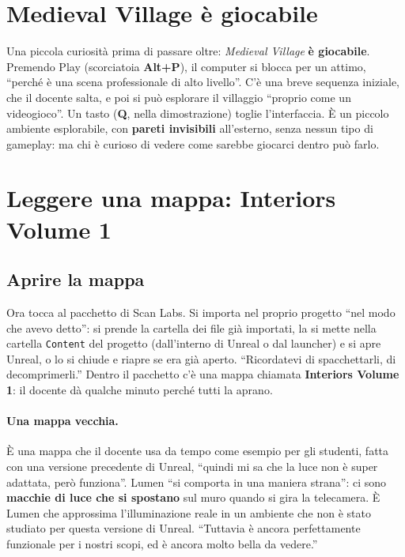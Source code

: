\section{Medieval Village è giocabile}
\label{gd14:sec:play}

Una piccola curiosità prima di passare oltre: \emph{Medieval Village} \textbf{è
giocabile}. Premendo Play (scorciatoia \textbf{Alt+P}), il computer si blocca per un
attimo, ``perché è una scena professionale di alto livello''. C'è una breve
sequenza iniziale, che il docente salta, e poi si può esplorare il villaggio
``proprio come un videogioco''. Un tasto (\textbf{Q}, nella dimostrazione) toglie
l'interfaccia. È un piccolo ambiente esplorabile, con \textbf{pareti invisibili}
all'esterno, senza nessun tipo di gameplay: ma chi è curioso di vedere come sarebbe
giocarci dentro può farlo.

\section{Leggere una mappa: Interiors Volume 1}
\label{gd14:sec:scanlabs}

\subsection{Aprire la mappa}

Ora tocca al pacchetto di Scan Labs. Si importa nel proprio progetto ``nel modo che
avevo detto'': si prende la cartella dei file già importati, la si mette nella
cartella \texttt{Content} del progetto (dall'interno di Unreal o dal launcher) e si
apre Unreal, o lo si chiude e riapre se era già aperto. ``Ricordatevi di
spacchettarli, di decomprimerli.'' Dentro il pacchetto c'è una mappa chiamata
\textbf{Interiors Volume 1}: il docente dà qualche minuto perché tutti la aprano.

\paragraph{Una mappa vecchia.} È una mappa che il docente usa da tempo come esempio
per gli studenti, fatta con una versione precedente di Unreal, ``quindi mi sa che la
luce non è super adattata, però funziona''. Lumen ``si comporta in una maniera
strana'': ci sono \textbf{macchie di luce che si spostano} sul muro quando si gira
la telecamera. È Lumen che approssima l'illuminazione reale in un ambiente che non
è stato studiato per questa versione di Unreal. ``Tuttavia è ancora perfettamente
funzionale per i nostri scopi, ed è ancora molto bella da vedere.''

